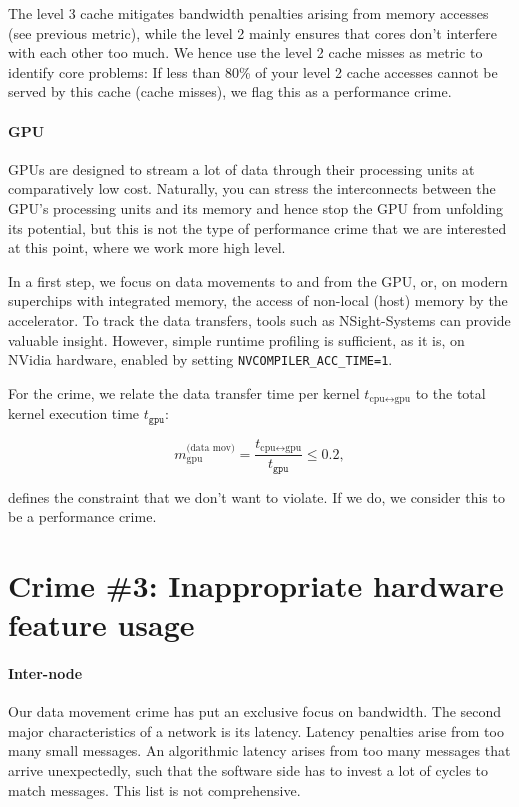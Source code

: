 The level 3 cache mitigates bandwidth penalties arising from memory accesses
(see previous metric), while the level 2 mainly ensures that cores don't
interfere with each other too much.
We hence use the level 2 cache misses as metric to identify core problems:
If less than 80\% of your level 2 cache accesses cannot be served by this cache
(cache misses), we flag this as a performance crime.


\paragraph*{GPU}

GPUs are designed to stream a lot of data through their processing units at
comparatively low cost.
Naturally, you can stress the interconnects between the GPU's processing units
and its memory and hence stop the GPU from unfolding its potential, but this is
not the type of performance crime that we are interested at this point, where
we work more high level.


In a first step, we focus on data movements to and from the GPU, or, on modern
superchips with integrated memory, the access of non-local (host) memory by the
accelerator.
To track the data transfers, tools such as NSight-Systems can provide valuable
insight. 
However, simple runtime profiling is sufficient, as it is, on NVidia hardware,
enabled by setting \texttt{NVCOMPILER\_ACC\_TIME=1}.


For the crime, we relate the data transfer time per kernel
$t_{\text{cpu}\leftrightarrow \text{gpu}}$ to the total kernel execution time
$t_{\texttt{gpu}}$:

\[
  m^{\text{(data mov)}}_{\text{gpu}} = \frac{t_{\text{cpu}\leftrightarrow
  \text{gpu}}}{t_{\texttt{gpu}}} \leq 0.2,
\]

\noindent
defines the constraint that we don't want to violate.
If we do, we consider this to be a performance crime.


\section{Crime \#3: Inappropriate hardware feature usage}


\paragraph*{Inter-node}

Our data movement crime has put an exclusive focus on bandwidth.
The second major characteristics of a network is its latency.
Latency penalties arise from too many small messages.
An algorithmic latency arises from too many messages that arrive unexpectedly,
such that the software side has to invest a lot of cycles to match messages.
This list is not comprehensive.



